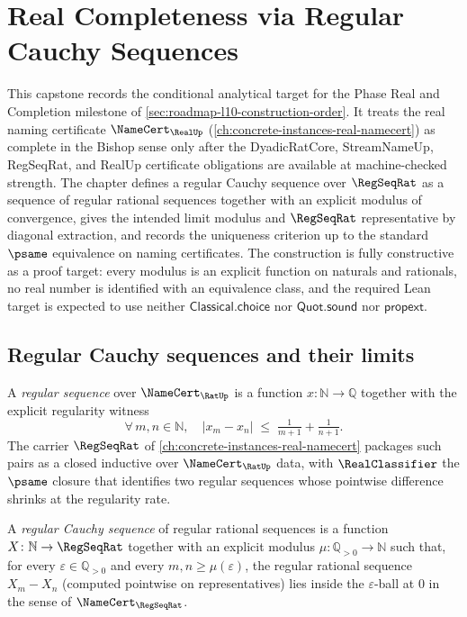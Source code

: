 \chapter{Real Completeness via Regular Cauchy Sequences}
\label{ch:capstones-real-completeness}

This capstone records the conditional analytical target for the Phase Real and Completion milestone of \autoref{sec:roadmap-l10-construction-order}. It treats the real naming certificate $\NameCert_{\RealUp}$ (\autoref{ch:concrete-instances-real-namecert}) as complete in the Bishop sense only after the DyadicRatCore, StreamNameUp, RegSeqRat, and RealUp certificate obligations are available at machine-checked strength. The chapter defines a regular Cauchy sequence over $\RegSeqRat$ as a sequence of regular rational sequences together with an explicit modulus of convergence, gives the intended limit modulus and $\RegSeqRat$ representative by diagonal extraction, and records the uniqueness criterion up to the standard $\psame$ equivalence on naming certificates. The construction is fully constructive as a proof target: every modulus is an explicit function on naturals and rationals, no real number is identified with an equivalence class, and the required Lean target is expected to use neither $\mathsf{Classical.choice}$ nor $\mathsf{Quot.sound}$ nor $\mathsf{propext}$.

\section{Regular Cauchy sequences and their limits}
\label{sec:real-completeness-regular-cauchy}

\begin{definition}
\label{def:real-completeness-regular-rat-sequence}
A \emph{regular sequence} over $\NameCert_{\RatUp}$ is a function $x \colon \mathbb{N} \to \mathbb{Q}$ together with the explicit regularity witness
$$ \forall\, m, n \in \mathbb{N}, \quad |x_m - x_n| \;\le\; \tfrac{1}{m+1} + \tfrac{1}{n+1}. $$
The carrier $\RegSeqRat$ of \autoref{ch:concrete-instances-real-namecert} packages such pairs as a closed inductive over $\NameCert_{\RatUp}$ data, with $\RealClassifier$ the $\psame$ closure that identifies two regular sequences whose pointwise difference shrinks at the regularity rate.
\end{definition}

\begin{definition}
\label{def:real-completeness-regular-cauchy-rat}
A \emph{regular Cauchy sequence} of regular rational sequences is a function $X \colon \mathbb{N} \to \RegSeqRat$ together with an explicit modulus $\mu \colon \mathbb{Q}_{>0} \to \mathbb{N}$ such that, for every $\varepsilon \in \mathbb{Q}_{>0}$ and every $m, n \ge \mu(\varepsilon)$, the regular rational sequence $X_m - X_n$ (computed pointwise on representatives) lies inside the $\varepsilon$-ball at $0$ in the sense of $\NameCert_{\RegSeqRat}$.
\end{definition}

